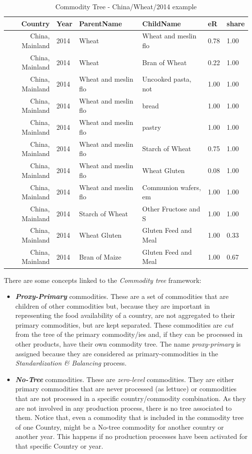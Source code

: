 \documentclass[]{article}
\providecommand{\tightlist}{%
  \setlength{\itemsep}{0pt}\setlength{\parskip}{0pt}}
\begin{document}
\begin{table}

\caption{\label{tab:t15}Commodity Tree - China/Wheat/2014 example}
\centering
\begin{tabular}[t]{r|l|l|l|l|l}
\hline
Country & Year & ParentName & ChildName & eR & share\\
\hline
China, Mainland & 2014 & Wheat & Wheat and meslin flo & 0.78 & 1.00\\
\hline
China, Mainland & 2014 & Wheat & Bran of Wheat & 0.22 & 1.00\\
\hline
China, Mainland & 2014 & Wheat and meslin flo & Uncooked pasta, not & 1.00 & 1.00\\
\hline
China, Mainland & 2014 & Wheat and meslin flo & bread & 1.00 & 1.00\\
\hline
China, Mainland & 2014 & Wheat and meslin flo & pastry & 1.00 & 1.00\\
\hline
China, Mainland & 2014 & Wheat and meslin flo & Starch of Wheat & 0.75 & 1.00\\
\hline
China, Mainland & 2014 & Wheat and meslin flo & Wheat Gluten & 0.08 & 1.00\\
\hline
China, Mainland & 2014 & Wheat and meslin flo & Communion wafers, em & 1.00 & 1.00\\
\hline
China, Mainland & 2014 & Starch of Wheat & Other Fructose and S & 1.00 & 1.00\\
\hline
China, Mainland & 2014 & Wheat Gluten & Gluten Feed and Meal & 1.00 & 0.33\\
\hline
China, Mainland & 2014 & Bran of Maize & Gluten Feed and Meal & 1.00 & 0.67\\
\hline
\end{tabular}
\end{table}

There are some concepts linked to the \emph{Commodity tree} framework:

\begin{itemize}
\tightlist
\item
  \textbf{\emph{Proxy-Primary}} commodities. These are a set of
  commodities that are children of other commodities but, because they
  are important in representing the food availability of a country, are
  not aggregated to their primary commodities, but are kept separated.
  These commodities are \emph{cut} from the tree of the primary
  commodity/ies and, if they can be processed in other products, have
  their own commodity tree. The name \emph{proxy-primary} is assigned
  because they are considered as primary-commodities in the
  \emph{Standardization \& Balancing} process.
\item
  \textbf{\emph{No-Tree}} commodities. These are \emph{zero-level}
  commodities. They are either primary commodities that are never
  processed (as lettuce) or commodities that are not processed in a
  specific country/commodity combination. As they are not involved in
  any production process, there is no tree associated to them. Notice
  that, even a commodity that is included in the commodity tree of one
  Country, might be a No-tree commodity for another country or another
  year. This happens if no production processes have been activated for
  that specific Country or year.
\end{itemize}
\end{document}
